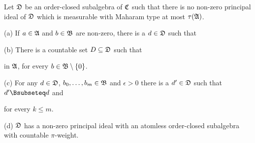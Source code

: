 Let $\frak D$ be an
order-closed subalgebra of $\frak C$ such that there is
no non-zero principal ideal of
$\frak D$ which is measurable with Maharam type at most $\tau(\frak A)$.

(a) If $a\in\frak A$ and $b\in\frak B$ are non-zero, there is a
$d\in\frak D$ such that


(b) There is a countable set $D\subseteq\frak D$ such that


\noindent in $\frak A$, for every $b\in\frak B\setminus\{0\}$.

(c) For any $d\in\frak D$, $b_0,\ldots,b_m\in\frak B$ and $\epsilon>0$
there is a $d'\in\frak D$ such that $d'\Bsubseteq d$ and



\noindent for every $k\le m$.

(d) $\frak D$ has a non-zero principal ideal with an atomless order-closed subalgebra
with countable $\pi$-weight.

